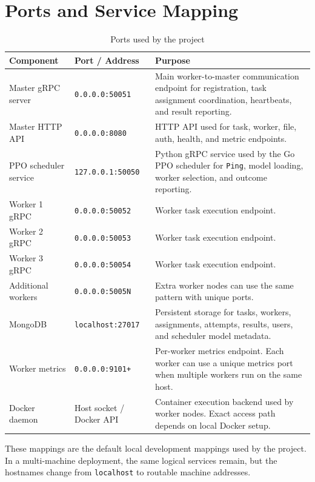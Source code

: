\section{Ports and Service Mapping}

\begin{table}[H]
\centering
\caption{Ports used by the project}
\label{tab:ports}
\begin{tabularx}{\textwidth}{l l X}
\toprule
\textbf{Component} & \textbf{Port / Address} & \textbf{Purpose} \\
\midrule
Master gRPC server & \texttt{0.0.0.0:50051} & Main worker-to-master communication endpoint for registration, task assignment coordination, heartbeats, and result reporting. \\
Master HTTP API & \texttt{0.0.0.0:8080} & HTTP API used for task, worker, file, auth, health, and metric endpoints. \\
PPO scheduler service & \texttt{127.0.0.1:50050} & Python gRPC service used by the Go PPO scheduler for \texttt{Ping}, model loading, worker selection, and outcome reporting. \\
Worker 1 gRPC & \texttt{0.0.0.0:50052} & Worker task execution endpoint. \\
Worker 2 gRPC & \texttt{0.0.0.0:50053} & Worker task execution endpoint. \\
Worker 3 gRPC & \texttt{0.0.0.0:50054} & Worker task execution endpoint. \\
Additional workers & \texttt{0.0.0.0:5005N} & Extra worker nodes can use the same pattern with unique ports. \\
MongoDB & \texttt{localhost:27017} & Persistent storage for tasks, workers, assignments, attempts, results, users, and scheduler model metadata. \\
Worker metrics & \texttt{0.0.0.0:9101+} & Per-worker metrics endpoint. Each worker can use a unique metrics port when multiple workers run on the same host. \\
Docker daemon & Host socket / Docker API & Container execution backend used by worker nodes. Exact access path depends on local Docker setup. \\
\bottomrule
\end{tabularx}
\end{table}

These mappings are the default local development mappings used by the project. In a multi-machine deployment, the same logical services remain, but the hostnames change from \texttt{localhost} to routable machine addresses.
